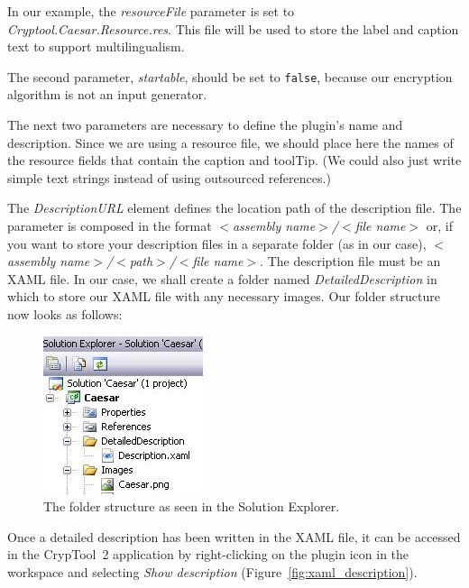In our example, the \textit{resourceFile} parameter is set to \textit{Cryptool.Caesar.Resource.res}. This file will be used to store the label and caption text to support multilingualism.

The second parameter, \textit{startable}, should be set to \texttt{false}, because our encryption algorithm is not an input generator.

The next two parameters are necessary to define the plugin's name and description. Since we are using a resource file, we should place here the names of the resource fields that contain the caption and toolTip. (We could also just write simple text strings instead of using outsourced references.)

The \textit{DescriptionURL} element defines the location path of the description file. The parameter is composed in the format \textit{$<$assembly name$>$/$<$file name$>$} or, if you want to store your description files in a separate folder (as in our case), \textit{$<$assembly name$>$/$<$path$>$/$<$file name$>$}. The description file must be an XAML file. In our case, we shall create a folder named \textit{DetailedDescription} in which to store our XAML file with any necessary images. Our folder structure now looks as follows:

\begin{figure}[h!]
	\centering
		\includegraphics[width=.30\textwidth]{figures/detailed_description.jpg}
	\caption{The folder structure as seen in the Solution Explorer.}
	\label{fig:attribute_plugininfo_icon_path}
\end{figure}

Once a detailed description has been written in the XAML file, it can be accessed in the CrypTool~2 application by right-clicking on the plugin icon in the workspace and selecting \textit{Show description} \mbox{(Figure \ref{fig:xaml_description})}.

